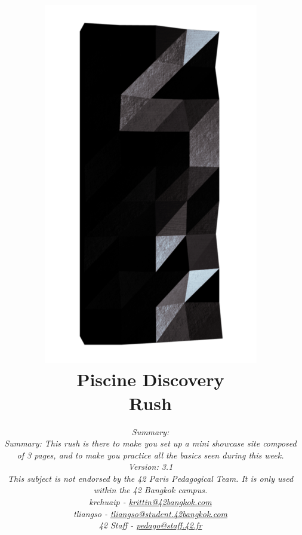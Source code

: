\documentclass[12pt, a4paper]{report}
\renewcommand{\thechapter}{\Roman{chapter}}
\begin{document}
\begin{titlepage}
	\centering
	\title{%
		\vspace{-6cm}
		\includegraphics[scale=1.8]{Logo_42.png} \\
		\vspace{1cm}
		\huge Piscine Discovery\\
		\vspace{.6cm}
		\LARGE Rush
		}

	\date{%
		\vspace{2.2cm}
		\it\normalsize Summary: \\
		Summary: This rush is there to make you set up a mini showcase site composed of 3 pages, and to make you practice all the basics seen during this week. \\
		\vspace{.8cm}
		Version: 3.1 \\
		This subject is not endorsed by the 42 Paris Pedagogical Team. It is only used within the 42 Bangkok campus.\\
		\vspace{2.2cm}
		krchuaip - \href{mailto:krittin@42bangkok.com}{krittin@42bangkok.com}\\
		tliangso - \href{mailto:tliangso@student.42bangkok.com}{tliangso@student.42bangkok.com}\\
		42 Staff - \href{mailto:pedago@staff.42.fr}{pedago@staff.42.fr}
		}
	\maketitle


	\end{titlepage}
\end{document}

